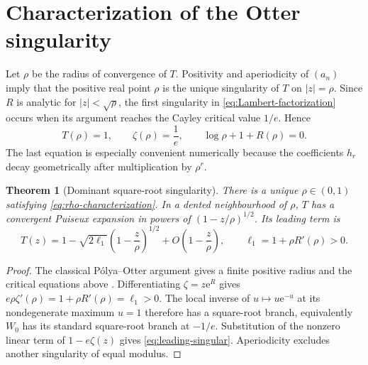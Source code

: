 \documentclass[11pt,a4paper,oneside,openany]{book}
\newtheorem{theorem}{Theorem}[chapter]
\theoremstyle{definition}
\theoremstyle{remark}
\newcommand{\e}{\mathrm e}
\begin{document}
\section{Characterization of the Otter singularity}
Let $\rho$ be the radius of convergence of $T$.  Positivity and aperiodicity of
$(a_n)$ imply that the positive real point $\rho$ is the unique singularity of
$T$ on $|z|=\rho$.  Since $R$ is analytic for $|z|<\sqrt\rho$, the first
singularity in \cref{eq:Lambert-factorization} occurs when its argument reaches
the Cayley critical value $1/e$.  Hence
\begin{equation}
 T(\rho)=1,
 \qquad
 \zeta(\rho)=\frac1e,
 \qquad
 \log\rho+1+R(\rho)=0.
 \label{eq:rho-characterization}
\end{equation}
The last equation is especially convenient numerically because the coefficients
$h_r$ decay geometrically after multiplication by $\rho^r$.

\begin{theorem}[Dominant square-root singularity]
\label{thm:dominant-singularity}
There is a unique $\rho\in(0,1)$ satisfying
\cref{eq:rho-characterization}.  In a dented neighbourhood of $\rho$, $T$ has a
convergent Puiseux expansion in powers of $(1-z/\rho)^{1/2}$.  Its leading term is
\begin{equation}
 T(z)=1-\sqrt{2\ell_1}\left(1-\frac z\rho\right)^{1/2}
      +O\!\left(1-\frac z\rho\right),
 \qquad
 \ell_1=1+\rho R'(\rho)>0.
 \label{eq:leading-singular}
\end{equation}
\end{theorem}

\begin{proof}
The classical P\'olya--Otter argument gives a finite positive radius and the
critical equations above \cite{Polya1937,Otter1948,FlajoletSedgewick2009}.  Differentiating $\zeta=z\e^R$ gives
$e\rho\zeta'(\rho)=1+\rho R'(\rho)=\ell_1>0$.  The local inverse of
$u\mapsto u\e^{-u}$ at its nondegenerate maximum $u=1$ therefore has a
square-root branch, equivalently $W_0$ has its standard square-root branch at
$-1/e$.  Substitution of the nonzero linear term of $1-e\zeta(z)$ gives
\cref{eq:leading-singular}.  Aperiodicity excludes another singularity of equal
modulus.
\end{proof}
\end{document}
